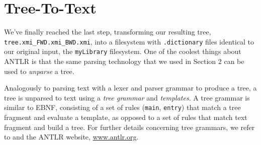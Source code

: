\newpage
\hypertarget{finalStep}{}
\section{Tree-To-Text}
\genHeader

We've finally reached the last step, transforming our resulting tree, \texttt{tree\-.xmi\-\_FWD\-.xmi\-\_BWD\-.xmi}, into a filesystem with \texttt{.dictionary}
files identical to our original input, the \texttt{myLibrary} filesystem. One of the coolest things about ANTLR is that the same parsing technology that we used
in Section 2 can be used to \emph{unparse} a tree.

Analogously to parsing text with a lexer and parser grammar to produce a tree, a tree is unparsed to text using a \emph{tree grammar} and \emph{templates}. A
tree grammar is similar to EBNF, consisting of a set of rules (\texttt{main}, \texttt{entry}) that match a tree fragment and evaluate a template, as
opposed to a set of rules that match text fragment and build a tree. For further details concerning tree grammars, we refer to \cite{ANTLR} and the ANTLR
website, \url{www.antlr.org}.

